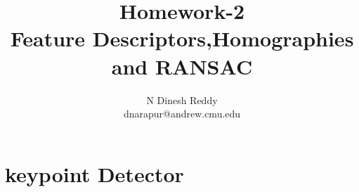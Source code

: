 \documentclass[12pt]{article}
\begin{document}
 
 
\title{Homework-2 \\ Feature Descriptors,Homographies and RANSAC}
\author{N Dinesh Reddy \\ dnarapur@andrew.cmu.edu }

\newpage

\maketitle
\section{keypoint Detector}
\end{document}
